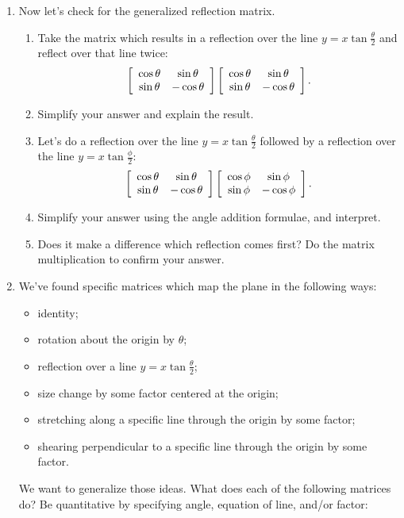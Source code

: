 \documentclass[../gatm.tex]{subfiles}
\begin{document}
\begin{enumerate}
\begin{enumerate}
\end{enumerate}
\item Now let's check for the generalized reflection matrix.
\begin{enumerate}
\item Take the matrix which results in a reflection over the line $y=x\tan \frac{\theta}{2}$ and reflect over that line twice: $$\left[\begin{array}{cc} \cos\theta & \sin\theta \\ \sin\theta & -\cos\theta \end{array}\right]\left[\begin{array}{cc} \cos\theta & \sin\theta \\ \sin\theta & -\cos\theta \end{array}\right].$$
\item Simplify your answer and explain the result.
\item Let's do a reflection over the line $y=x\tan\frac{\theta}{2}$ followed by a reflection over the line $y=x\tan\frac{\phi}{2}$:
$$\left[\begin{array}{cc} \cos\theta & \sin\theta \\ \sin\theta & -\cos\theta \end{array}\right]\left[\begin{array}{cc} \cos\phi & \sin\phi \\ \sin\phi & -\cos\phi \end{array}\right].$$
\item Simplify your answer using the angle addition formulae, and interpret.
\item Does it make a difference which reflection comes first? Do the matrix multiplication to confirm your answer.
\end{enumerate}
\item We've found specific matrices which map the plane in the following ways:
\setcounter{problem_i}{\value{enumi}}
\begin{itemize}
\item identity; %
\item rotation about the origin by $\theta$; %
\item reflection over a line $y=x \tan\frac{\theta}{2}$; %
\item size change by some factor centered at the origin; %
\item stretching along a specific line through the origin by some factor; %
\item shearing perpendicular to a specific line through the origin by some factor. %
\end{itemize}
\setcounter{enumi}{\value{problem_i}}
We want to generalize those ideas. What does each of the following matrices do? Be quantitative by specifying angle, equation of line, and/or factor:\label{prob:list_transformations}
\begin{enumerate}
\end{enumerate}
\end{enumerate}
\end{document}
